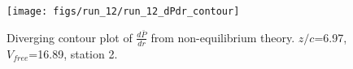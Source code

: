 \begin{figure}[H]
\centering
\texttt{[image: figs/run\_12/run\_12\_dPdr\_contour]}
\caption{Diverging contour plot of $\frac{d\bar{P}}{dr}$ from non-equilibrium theory. $z/c$=6.97, $V_{free}$=16.89, station 2.}
\label{fig:run_12_dPdr_contour}
\end{figure}


